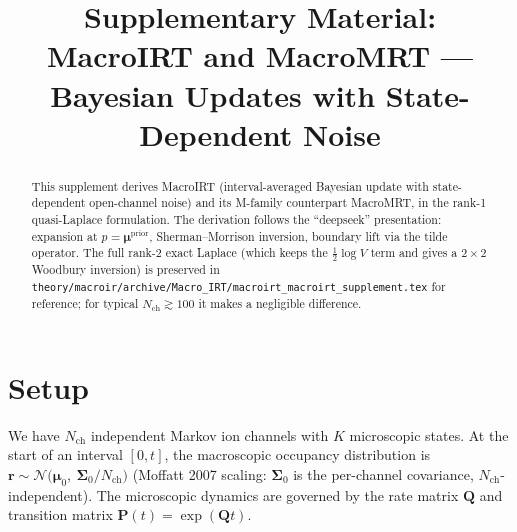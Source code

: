 \documentclass[11pt]{article}
\title{Supplementary Material:\\
MacroIRT and MacroMRT --- Bayesian Updates with State-Dependent Noise}
\author{}
\date{}
\begin{document}
\maketitle

\newcommand{\E}{\mathbb{E}}
\newcommand{\Var}{\operatorname{Var}}
\newcommand{\diag}{\operatorname{diag}}
\newcommand{\Nch}{N_{\mathrm{ch}}}
\newcommand{\gbarz}{\overline{\boldsymbol{\gamma}}_0}
\newcommand{\sbarz}{\overline{\boldsymbol{\sigma}^2}_0}
\newcommand{\Gbarmat}{\overline{\boldsymbol{\Gamma}}}
\newcommand{\Vbarmat}{\overline{\boldsymbol{V}}}
\newcommand{\Vbarv}{\overline{\boldsymbol{V}}_{\!v}}
\newcommand{\tildegg}{\widetilde{\gamma^{T}\Sigma\gamma}}
\newcommand{\tildevv}{\widetilde{v^{T}\Sigma v}}
\newcommand{\tildegvec}{\widetilde{\gamma^{T}\Sigma}}
\newcommand{\tildevvec}{\widetilde{v^{T}\Sigma}}
\newcommand{\Sprop}{\boldsymbol{\Sigma}^{\mathrm{prop}}}
\newcommand{\Spost}{\boldsymbol{\Sigma}^{\mathrm{post}}}
\newcommand{\mupost}{\boldsymbol{\mu}^{\mathrm{post}}}
\newcommand{\muprior}{\boldsymbol{\mu}^{\mathrm{prior}}}
\newcommand{\SmD}{\mathrm{SmD}}

\begin{abstract}
This supplement derives MacroIRT (interval-averaged Bayesian update with
state-dependent open-channel noise) and its M-family counterpart MacroMRT,
in the rank-1 quasi-Laplace formulation. The derivation follows the
``deepseek'' presentation: expansion at $p=\muprior$, Sherman--Morrison
inversion, boundary lift via the tilde operator. The full rank-2 exact
Laplace (which keeps the $\tfrac12\log V$ term and gives a $2\times2$
Woodbury inversion) is preserved in
\texttt{theory/macroir/archive/Macro\_IRT/macroirt\_macroirt\_supplement.tex}
for reference; for typical $\Nch\gtrsim 100$ it makes a negligible
difference.
\end{abstract}

\section{Setup}

We have $\Nch$ independent Markov ion channels with $K$ microscopic states.
At the start of an interval $[0,t]$, the macroscopic occupancy distribution is
$\mathbf{r} \sim \mathcal{N}\!\bigl(\boldsymbol{\mu}_0,\ \boldsymbol{\Sigma}_0/\Nch\bigr)$
(Moffatt 2007 scaling: $\boldsymbol{\Sigma}_0$ is the per-channel covariance,
$\Nch$-independent). The microscopic dynamics are governed by the rate
matrix $\mathbf{Q}$ and transition matrix
$\mathbf{P}(t) = \exp(\mathbf{Q}t)$.
\end{document}
